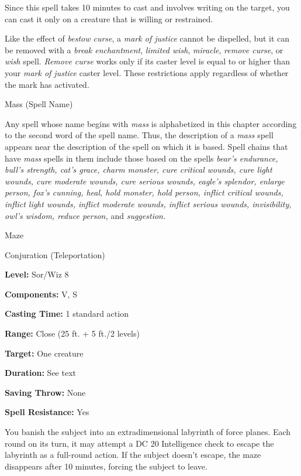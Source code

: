 \documentclass{article}
\begin{document}
Since this spell takes 10 minutes to cast and involves writing on the target, you 
can cast it only on a creature that is willing or restrained.

Like the effect of \textit{bestow curse}, a \textit{mark of justice }cannot be 
dispelled, but it can be removed with a \textit{break enchantment}, \textit{limited 
wish}, \textit{miracle}, \textit{remove curse}, or \textit{wish }spell. \textit{Remove 
curse }works only if its caster level is equal to or higher than your \textit{mark 
of justice }caster level. These restrictions apply regardless of whether the mark 
has activated.

\vspace{12pt}
Mass (Spell Name)

Any spell whose name begins with \textit{mass }is alphabetized in this chapter 
according to the second word of the spell name. Thus, the description of a \textit{mass 
}spell appears near the description of the spell on which it is based. Spell chains 
that have \textit{mass }spells in them include those based on the spells \textit{bear's 
endurance, bull's strength, cat's grace, charm monster, cure critical wounds, cure 
light wounds, cure moderate wounds, cure serious wounds, eagle's splendor, enlarge 
person, fox's cunning, heal, hold monster, hold person, inflict critical wounds, 
inflict light wounds, inflict moderate wounds, inflict serious wounds, invisibility, 
owl's wisdom, reduce person, }and \textit{suggestion.}

\vspace{12pt}
Maze

Conjuration (Teleportation)

\textbf{Level:} Sor/Wiz 8

\textbf{Components:} V, S

\textbf{Casting Time:} 1 standard action

\textbf{Range:} Close (25 ft. + 5 ft./2 levels)

\textbf{Target:} One creature

\textbf{Duration:} See text

\textbf{Saving Throw:} None

\textbf{Spell Resistance:} Yes

You banish the subject into an extradimensional labyrinth of force planes. Each 
round on its turn, it may attempt a DC 20 Intelligence check to escape the labyrinth 
as a full-round action. If the subject doesn't escape, the maze disappears after 
10 minutes, forcing the subject to leave.
\end{document}
